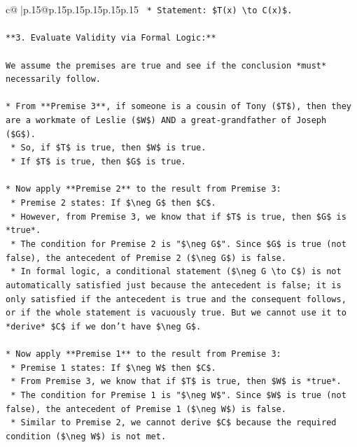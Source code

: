\documentclass{article}
\begin{document}
{\begin{supertabular}{c@{$\;$}|p{.15\linewidth}@{}p{.15\linewidth}p{.15\linewidth}p{.15\linewidth}p{.15\linewidth}p{.15\linewidth}}
{{{\texttt{    *   Statement: \$T(x) \textbackslash{}to C(x)\$.} \\
\\ 
\texttt{**3. Evaluate Validity via Formal Logic:**} \\
\\ 
\texttt{We assume the premises are true and see if the conclusion *must* necessarily follow.} \\
\\ 
\texttt{*   From **Premise 3**, if someone is a cousin of Tony (\$T\$), then they are a workmate of Leslie (\$W\$) AND a great{-}grandfather of Joseph (\$G\$).} \\
\texttt{    *   So, if \$T\$ is true, then \$W\$ is true.} \\
\texttt{    *   If \$T\$ is true, then \$G\$ is true.} \\
\\ 
\texttt{*   Now apply **Premise 2** to the result from Premise 3:} \\
\texttt{    *   Premise 2 states: If \$\textbackslash{}neg G\$ then \$C\$.} \\
\texttt{    *   However, from Premise 3, we know that if \$T\$ is true, then \$G\$ is *true*.} \\
\texttt{    *   The condition for Premise 2 is "\$\textbackslash{}neg G\$". Since \$G\$ is true (not false), the antecedent of Premise 2 (\$\textbackslash{}neg G\$) is false.} \\
\texttt{    *   In formal logic, a conditional statement (\$\textbackslash{}neg G \textbackslash{}to C\$) is not automatically satisfied just because the antecedent is false; it is only satisfied if the antecedent is true and the consequent follows, or if the whole statement is vacuously true. But we cannot use it to *derive* \$C\$ if we don't have \$\textbackslash{}neg G\$.} \\
\\ 
\texttt{*   Now apply **Premise 1** to the result from Premise 3:} \\
\texttt{    *   Premise 1 states: If \$\textbackslash{}neg W\$ then \$C\$.} \\
\texttt{    *   From Premise 3, we know that if \$T\$ is true, then \$W\$ is *true*.} \\
\texttt{    *   The condition for Premise 1 is "\$\textbackslash{}neg W\$". Since \$W\$ is true (not false), the antecedent of Premise 1 (\$\textbackslash{}neg W\$) is false.} \\
\texttt{    *   Similar to Premise 2, we cannot derive \$C\$ because the required condition (\$\textbackslash{}neg W\$) is not met.} \\
}}}
\end{supertabular}}
\end{document}

